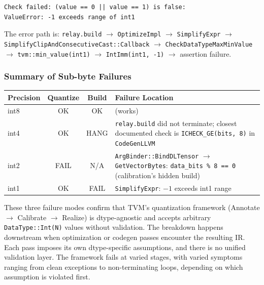 \documentclass[11pt,a4paper]{article}
\begin{document}
\begin{lstlisting}
Check failed: (value == 0 || value == 1) is false:
ValueError: -1 exceeds range of int1
\end{lstlisting}

The error path is: \texttt{relay.build} $\rightarrow$ \texttt{OptimizeImpl} $\rightarrow$ \texttt{SimplifyExpr} $\rightarrow$ \texttt{SimplifyClipAnd\-Consecutive\-Cast::\allowbreak Callback} $\rightarrow$ \texttt{CheckDataTypeMaxMinValue} $\rightarrow$ \texttt{tvm::min\_value(int1)} $\rightarrow$ \texttt{IntImm(int1, -1)} $\rightarrow$ assertion failure.

\subsubsection{Summary of Sub-byte Failures}

\begin{table}[h]
\centering
\begin{tabular}{lccp{}}
\toprule
\textbf{Precision} & \textbf{Quantize} & \textbf{Build} & \textbf{Failure Location} \\
\midrule
int8 & OK   & OK   & (works) \\
int4 & OK   & HANG & \texttt{relay.build} did not terminate; closest documented check is \texttt{ICHECK\_GE(bits, 8)} in \texttt{CodeGenLLVM} \\
int2 & FAIL & N/A  & \texttt{ArgBinder::BindDLTensor} $\rightarrow$ \texttt{GetVectorBytes}: \texttt{data\_bits \% 8 == 0} (calibration's hidden build) \\
int1 & OK   & FAIL & \texttt{SimplifyExpr}: $-1$ exceeds int1 range \\
\bottomrule
\end{tabular}
\end{table}

These three failure modes confirm that TVM's quantization framework (Annotate $\rightarrow$ Calibrate $\rightarrow$ Realize) is dtype-agnostic and accepts arbitrary \texttt{DataType::Int(N)} values without validation. The breakdown happens downstream when optimization or codegen passes encounter the resulting IR. Each pass imposes its own dtype-specific assumptions, and there is no unified validation layer. The framework fails at varied stages, with varied symptoms ranging from clean exceptions to non-terminating loops, depending on which assumption is violated first.
\end{document}
